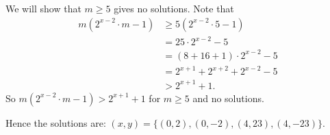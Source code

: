 \documentclass[problems.tex]{subfile}
\begin{document}
\begin{solution}
\begin{enumerate}
			We will show that $m \ge 5$ gives no solutions. Note that
			\begin{align*}
			m(2^{x - 2} \cdot m - 1) & \ge 5(2^{x - 2} \cdot 5 - 1) \\
			& = 25 \cdot 2^{x - 2} - 5 \\
			& = (8 + 16 + 1) \cdot 2^{x - 2} - 5  \\
			& = 2^{x + 1} + 2^{x + 2} + 2^{x - 2} - 5 \\
			& > 2^{x + 1} + 1.
			\end{align*}
			So $m(2^{x - 2} \cdot m - 1) > 2^{x + 1} + 1$ for $m \ge 5$ and no solutions.
		\end{enumerate}
		Hence the solutions are: $(x,  y) = \{(0,  2), (0, -2), (4,  23),  (4, -23)\}$.
	\end{solution}
	
%	
	
\end{document}
